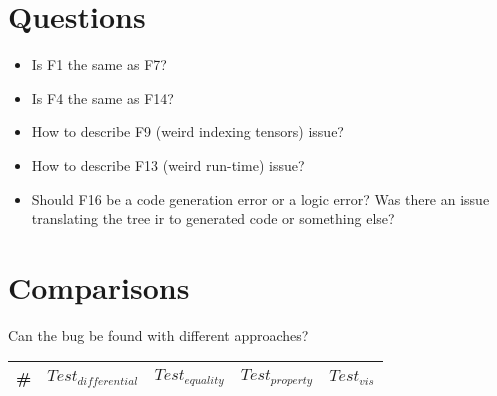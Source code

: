 \documentclass{article}
\newcommand{\testA}[0]{$\textit{Test}_{differential}$}
\newcommand{\testB}[0]{$\textit{Test}_{equality}$}
\newcommand{\testC}[0]{$\textit{Test}_{property}$}
\newcommand{\testD}[0]{$\textit{Test}_{vis}$}
\begin{document}
\section{Questions}
\begin{itemize}[noitemsep]
\item Is F1 the same as F7?
\item  Is F4 the same as F14?  
\item How to describe F9 (weird indexing tensors) issue?
\item How to describe F13 (weird run-time) issue?
\item Should F16 be a code generation error or a logic error? Was there an issue translating the tree ir to generated code or something else?
\end{itemize}



\section{Comparisons}
Can the bug be found with different approaches?\\
\begin{tabular}{|l|llll|}
\hline
\# & \testA{} & \testB{} & \testC{} & \testD{}\\
\hline
\end{tabular}




\end{document}
